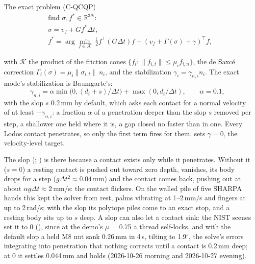 \begin{equationbox}{The exact problem (C-QCQP)}
\begin{equation}\label{eq:cqcqp}
\begin{aligned}
&\text{find } \sigma, f^* \in \mathbb R^{3N}: \\
&\sigma = v_f + G f^* \Delta t, \\
&f^* = \arg\min_{f \in \mathcal K}\ \tfrac12 f^\top (G \Delta t) f + (v_f + \Gamma(\sigma) + \gamma)^\top f ,
\end{aligned}
\end{equation}
\end{equationbox}

with $\mathcal K$ the product of the friction cones $\{f_i : \lVert f_{i,t}\rVert \le \mu_i f_{i,n}\}$, the de Saxc\'e correction $\Gamma_i(\sigma) = \mu_i \lVert \sigma_{i,t}\rVert\, n_i$, and the stabilization $\gamma_i = \gamma_{n,i} n_i$. The exact mode's stabilization is Baumgarte's:
\begin{equation}\label{eq:baumgarte}
\gamma_{n,i} = \alpha \min\!\big(0, (d_i + s)/\Delta t\big) + \max(0, d_i/\Delta t), \qquad \alpha = 0.1,
\end{equation}
with the slop $s$ 0.2\,mm by default, which asks each contact for a normal velocity of at least $-\gamma_{n,i}$: a fraction $\alpha$ of a penetration deeper than the slop $s$ removed per step, a shallower one held where it is, a gap closed no faster than in one. Every Lodos contact penetrates, so only the first term fires for them.  sets $\gamma = 0$, the velocity-level target.

The slop (; ) is there because a contact exists only while it penetrates. Without it ($s = 0$) a resting contact is pushed out toward zero depth, vanishes, its body drops for a step ($g\Delta t^2 \approx 0.04$\,mm) and the contact comes back, pushing out at about $\alpha g \Delta t \approx 2$\,mm/s: the contact flickers. On the walled pile of five SHARPA hands this kept the solver from rest, palms vibrating at 1--2\,mm/s and fingers at up to 2\,rad/s; with the slop its polytope piles come to an exact stop, and a resting body sits up to $s$ deep. A slop can also let a contact sink: the NIST scenes set it to 0 (), since at the demo's $\mu$ = 0.75 a thread self-locks, and with the default slop a held M8 nut sank 0.26\,mm in 4\,s, tilting to 1.9$^\circ$, the solve's errors integrating into penetration that nothing corrects until a contact is 0.2\,mm deep; at 0 it settles 0.044\,mm and holds (2026-10-26 morning and 2026-10-27 evening).

